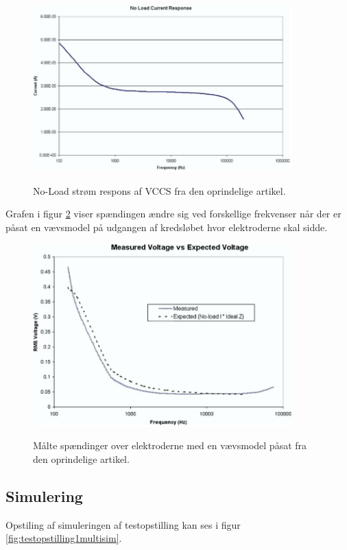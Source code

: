 \begin{figure}[H]
\centering
{\includegraphics[width=10cm]
{Figure/oprindeligenoload}}
\caption{No-Load strøm respons af VCCS fra den oprindelige artikel\cite{Aroom2009}.}
\label{fig:oprindeligeonload}
\end{figure}

Grafen i figur \ref{fig:oprindeligerms} viser spændingen ændre sig ved forskellige frekvenser når der er påsat en vævsmodel på udgangen af kredsløbet hvor elektroderne skal sidde. 


\begin{figure}[H]
\centering
{\includegraphics[width=10cm]
{Figure/oprindeligerms}}
\caption{Målte spændinger over elektroderne med en vævsmodel påsat  fra den oprindelige artikel\citep{Aroom2009}.}
\label{fig:oprindeligerms}
\end{figure}

\subsection{Simulering}

Opstiling af simuleringen af testopstilling kan ses i figur \ref{fig:testopstilling1multisim}. 

